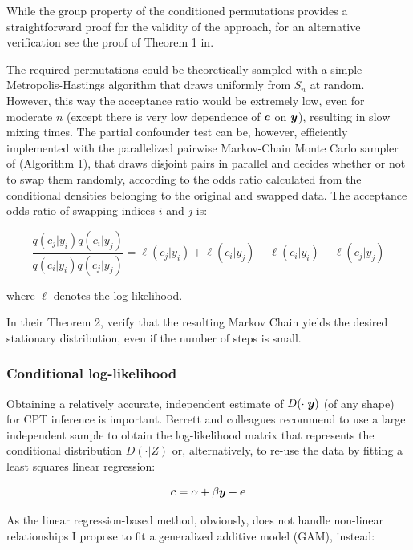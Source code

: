 \documentclass{article}
\begin{document}
While the group property of the conditioned permutations provides a straightforward proof for the validity of the approach, for an alternative verification see the proof of Theorem 1 in\citep{berrett2020conditional}.

The required permutations could be theoretically sampled with a simple Metropolis-Hastings algorithm that draws uniformly from $S_n$ at random. However, this way the acceptance ratio would be extremely low, even for moderate $n$ (except there is very low dependence of $\boldsymbol{c}$ on $\boldsymbol{y}$), resulting in slow mixing times. The partial confounder test can be, however, efficiently implemented with the parallelized pairwise Markov-Chain Monte Carlo sampler of\cite{berrett2020conditional} (Algorithm 1), that draws disjoint pairs in parallel and decides whether or not to swap them randomly, according to the odds ratio calculated from the conditional densities belonging to the original and swapped data. The acceptance odds ratio of swapping indices $i$ and $j$ is:

\begin{equation}
\frac{ q(c_j | y_i) q(c_i | y_j)}{q(c_i | y_i) q(c_j | y_j) }
=
\ell(c_j | y_i) + \ell(c_i | y_j) - \ell(c_i | y_i) - \ell(c_j | y_j) 
\label{eq:accept-odds}
\end{equation}

where $\ell$ denotes the log-likelihood.

In their Theorem 2,\cite{berrett2020conditional} verify that the resulting Markov Chain yields the desired stationary distribution, even if the number of steps is small.

\subsubsection*{Conditional log-likelihood}


Obtaining a relatively accurate, independent estimate of $D(\cdot|\boldsymbol{y})$ (of any shape) for CPT inference is important. Berrett and colleagues recommend to use a large independent sample to obtain the log-likelihood matrix that represents the conditional distribution $D(\cdot|Z)$ or, alternatively, to re-use the data by fitting a least squares linear regression:

\begin{equation}
    \label{eq:linreg}
    \boldsymbol{c} = \alpha + \beta \boldsymbol{y} + \boldsymbol{e}
\end{equation}

As the linear regression-based method, obviously, does not handle non-linear relationships I propose to fit a generalized additive model (GAM)\citep{hastie1987generalized}, instead:
\end{document}
